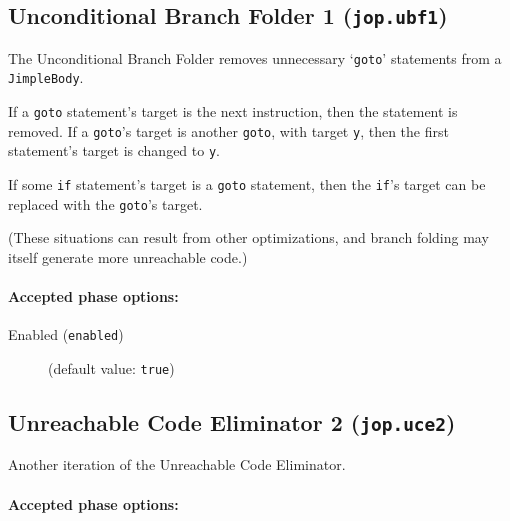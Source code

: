 \documentclass{article}
\begin{document}
\subsection{Unconditional Branch Folder 1 ({\tt jop.ubf1})}


\par

The Unconditional Branch Folder removes unnecessary `{\tt goto}'
statements from a {\tt JimpleBody}.

\par

If a {\tt goto} statement's target is the next instruction,
then the statement is removed.  If a {\tt goto}'s target is
another {\tt goto}, with target {\tt y}, then the first
statement's target is changed to {\tt y}.

\par

If some {\tt if} statement's target is a {\tt goto}
statement, then the {\tt if}'s target can be replaced with the
{\tt goto}'s target.

\par

(These situations can result from other optimizations, and branch
folding may itself generate more unreachable code.)


\paragraph{Accepted phase options:} 

\begin{description}

\item[Enabled ({\tt enabled})]
(default value: {\tt true})






\end{description}

\subsection{Unreachable Code Eliminator 2 ({\tt jop.uce2})}

Another iteration of the Unreachable Code Eliminator.


\paragraph{Accepted phase options:} 
\end{document}
